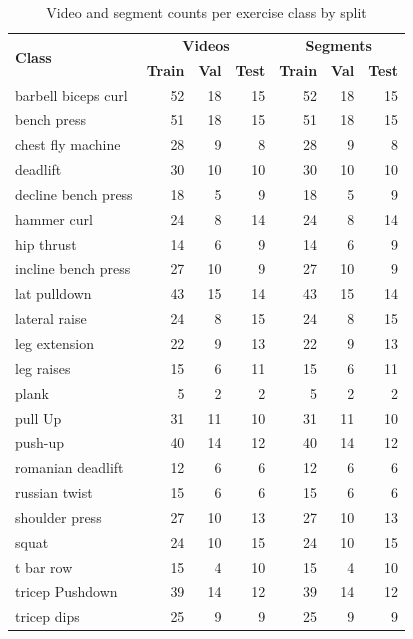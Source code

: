 \begin{table}[!h]
\centering
\caption{Video and segment counts per exercise class by split}
\label{tab:counts-per-class}
\begin{tabular}{l r r r | r r r}
\hline
\multirow{2}{*}{\textbf{Class}}   & \multicolumn{3}{c|}{\textbf{Videos}} & \multicolumn{3}{c}{\textbf{Segments}} \\
  & \textbf{Train} & \textbf{Val} & \textbf{Test} & \textbf{Train} & \textbf{Val} & \textbf{Test} \\
\hline
barbell biceps curl    & 52  & 18  & 15  & 52  & 18  & 15  \\
bench press            & 51  & 18  & 15  & 51  & 18  & 15  \\
chest fly machine      & 28  & 9   & 8   & 28  & 9   & 8   \\
deadlift               & 30  & 10  & 10  & 30  & 10  & 10  \\
decline bench press    & 18  & 5   & 9   & 18  & 5   & 9   \\
hammer curl            & 24  & 8   & 14  & 24  & 8   & 14  \\
hip thrust             & 14  & 6   & 9   & 14  & 6   & 9   \\
incline bench press    & 27  & 10  & 9   & 27  & 10  & 9   \\
lat pulldown           & 43  & 15  & 14  & 43  & 15  & 14  \\
lateral raise          & 24  & 8   & 15  & 24  & 8   & 15  \\
leg extension          & 22  & 9   & 13  & 22  & 9   & 13  \\
leg raises             & 15  & 6   & 11  & 15  & 6   & 11  \\
plank                  & 5   & 2   & 2   & 5   & 2   & 2   \\
pull Up                & 31  & 11  & 10  & 31  & 11  & 10  \\
push-up                & 40  & 14  & 12  & 40  & 14  & 12  \\
romanian deadlift      & 12  & 6   & 6   & 12  & 6   & 6   \\
russian twist          & 15  & 6   & 6   & 15  & 6   & 6   \\
shoulder press         & 27  & 10  & 13  & 27  & 10  & 13  \\
squat                  & 24  & 10  & 15  & 24  & 10  & 15  \\
t bar row              & 15  & 4   & 10  & 15  & 4   & 10  \\
tricep Pushdown        & 39  & 14  & 12  & 39  & 14  & 12  \\
tricep dips            & 25  & 9   & 9   & 25  & 9   & 9   \\
\hline
\end{tabular}
\end{table}
